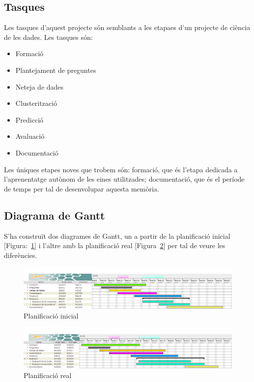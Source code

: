 \documentclass[12pt,a4paper,catalan]{article}
\begin{document}
\subsection{Tasques}
Les tasques d'aquest projecte són semblants a les etapaes d'un projecte de ciència de les dades. Les tasques són:
\begin{itemize}[leftmargin=.5in]
	\item Formació
	\item Plantejament de preguntes
	\item Neteja de dades
	\item Clusterització
	\item Predicció
	\item Avaluació
	\item Documentació
\end{itemize}

Les úniques etapes noves que trobem són: formació, que és l'etapa dedicada a l'aprenentatge autònom de les eines utilitzades; documentació, que és el període de temps per tal de desenvolupar aquesta memòria.

\newpage

\subsection{Diagrama de Gantt}
S'ha construït dos diagrames de Gantt, un a partir de la planificació inicial [Figura:~\ref{fig:planificacioinicial}] i l'altre amb la planificació real [Figura~\ref{fig:planificacioreal}] per tal de veure les diferències.

\begin{figure}[h]
\begin{center}
\includegraphics[width=\linewidth]{img/initialplanification.png}
\caption{Planificació inicial}
\label{fig:planificacioinicial}
\end{center}
\end{figure}


\begin{figure}[h]
\begin{center}
\includegraphics[width=\linewidth]{img/realplanification.png}
\caption{Planificació real}
\label{fig:planificacioreal}
\end{center}
\end{figure}
\end{document}
